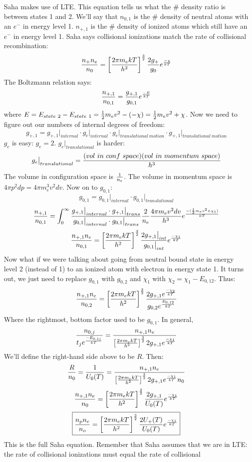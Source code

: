 \documentclass[11pt]{article}
\def\hf{{1 \over 2}}
\def\inv#1{{1 \over #1}}
\def\eval#1{\big|_{#1}}
\begin{document}
Saha makes use of LTE.  This equation tells us what the \# density ratio is
between states 1 and 2.  We'll say that $n_{0,1}$ is the \# density of neutral
atoms with an $e^-$ in energy level 1.  $n_{+,1}$ is the \# density of ionized
atoms which still have an $e^-$ in energy level 1.  Saha says
collisional ionizations match the rate of collisional recombination:
$${n_+n_e\over n_0}=\left[{2\pi m_ekT\over h^2}\right]^{3\over2}{2g_+\over
g_0}e^{-\chi\over kT}$$
The Boltzmann relation says:
\def\npo{n_{+,1}}
\def\noo{n_{0,1}}
\def\gpo{g_{+,1}}
\def\goo{g_{0,1}}
$${\npo\over\noo}={\gpo\over\goo}e^{-E\over kT}$$
where $E=E_{state\ 2}-E_{state\ 1}=\hf m_ev^2-(-\chi)=\hf m_ev^2+\chi$.  Now
we need to figure out our numbers of internal degrees of freedom:
$$\gpo =\gpo\eval{internal}\cdot g_e\eval{internal}\cdot 
g_e\eval{translational\ motion}\cdot \gpo\eval{translational\ motion}$$
$g_e$ is easy: $g_e=2$.  $g_e\eval{translational}$ is harder:
$$g_e\eval{translational} = {(vol\ in\ conf\ space)(vol\ in\ momentum\ space)
\over h^3}$$
The volume in configuration space is $\inv{n_e}$.  The volume in momentum
space is $4\pi p^2dp=4\pi m_e^3v^2dv$. Now on to $\goo$:
$$\goo=\goo\eval{internal}\cdot\goo\eval{translational}$$
$${\npo\over\noo}=\int_0^\infty{\gpo\eval{internal}\cdot\gpo\eval{trans}
\over\goo\eval{internal}\cdot\goo\eval{trans}}{2\over n_e}
{4\pi m_ev^2dv\over h^3}e^{-(\hf m_ev^2+\chi_1)\over kT}$$
$${\npo n_e\over \noo}=\left[{2\pi m_ekT\over h^2}\right]^{3\over2}
{2\gpo\eval{int}\over\goo\eval{int}}e^{-\chi_1\over kT}$$
Now what if we were talking about going from neutral bound state in energy
level 2 (instead of 1) to an ionized atom with electron in energy state 1.
It turns out, we just need to replace $\goo$ with $g_{0,2}$ and
\def\got{g_{0,2}}
\def\nzt{n_{0,2}}
$\chi_1$ with $\chi_2=\chi_1-E_{0,12}$.  Thus:
$${\npo n_e\over\nzt}=\left[{2\pi m_ekT\over h^2}\right]^{3\over2}{2\gpo
e^{-\chi_2\over kT}\over\got e^{E_{0,12}\over kT}}$$
\def\tpmekth{\left[{2\pi m_ekT\over h^2}\right]^{3\over2}}
Where the rightmost, bottom factor used to be $\goo$.  In general,
$${n_{0,j}\over t_je^{-E_{0,1j}\over kT}}={\npo n_e\over\tpmekth 2\gpo
e^{-\chi_1\over kT}}$$
We'll define the right-hand side above to be $R$.  Then:
$${R\over n_0}=\inv{U_0(T)}={\npo n_e\over\tpmekth 2\gpo
e^{-\chi_1\over kT}n_0}$$
$${\npo n_e\over n_0}=\tpmekth{2\gpo\over U_0(T)}
e^{-\chi_1\over kT}$$
$$\boxed{{n_pn_e\over n_o}=\tpmekth{2U_+(T)\over U_0(T)}
e^{-\chi_1\over kT}}$$
This is the full Saha equation.  Remember that Saha assumes that we are in LTE:
the rate of collisional ionizations must equal the rate of collisional 
\end{document}

